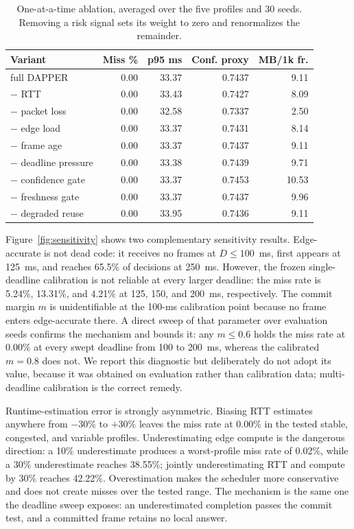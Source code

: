 \documentclass[conference,a4paper]{IEEEtran}
\begin{document}
\begin{table}[t]
\centering
\caption{One-at-a-time ablation, averaged over the five profiles and 30 seeds. Removing a risk signal sets its weight to zero and renormalizes the remainder.}
\label{tab:ablation}
\scriptsize
\renewcommand{\arraystretch}{0.88}
\setlength{\tabcolsep}{4pt}
\begin{tabular}{@{}lrrrr@{}}
\toprule
Variant & Miss \% & p95 ms & Conf. proxy & MB/1k fr. \\
\midrule
full DAPPER & 0.00 & 33.37 & 0.7437 & 9.11 \\
$-$ RTT & 0.00 & 33.43 & 0.7427 & 8.09 \\
$-$ packet loss & 0.00 & 32.58 & 0.7337 & 2.50 \\
$-$ edge load & 0.00 & 33.37 & 0.7431 & 8.14 \\
$-$ frame age & 0.00 & 33.37 & 0.7437 & 9.11 \\
$-$ deadline pressure & 0.00 & 33.38 & 0.7439 & 9.71 \\
$-$ confidence gate & 0.00 & 33.37 & 0.7453 & 10.53 \\
$-$ freshness gate & 0.00 & 33.37 & 0.7437 & 9.96 \\
$-$ degraded reuse & 0.00 & 33.95 & 0.7436 & 9.11 \\
\bottomrule
\end{tabular}
\end{table}

Figure~\ref{fig:sensitivity} shows two complementary sensitivity results. Edge-accurate is not dead code: it receives no frames at $D\leq100$~ms, first appears at 125~ms, and reaches 65.5\% of decisions at 250~ms. However, the frozen single-deadline calibration is not reliable at every larger deadline: the miss rate is 5.24\%, 13.31\%, and 4.21\% at 125, 150, and 200~ms, respectively. The commit margin $m$ is unidentifiable at the 100-ms calibration point because no frame enters edge-accurate there. A direct sweep of that parameter over evaluation seeds confirms the mechanism and bounds it: any $m\leq0.6$ holds the miss rate at 0.00\% at every swept deadline from 100 to 200~ms, whereas the calibrated $m=0.8$ does not. We report this diagnostic but deliberately do not adopt its value, because it was obtained on evaluation rather than calibration data; multi-deadline calibration is the correct remedy.

Runtime-estimation error is strongly asymmetric. Biasing RTT estimates anywhere from $-30$\% to $+30$\% leaves the miss rate at 0.00\% in the tested stable, congested, and variable profiles. Underestimating edge compute is the dangerous direction: a 10\% underestimate produces a worst-profile miss rate of 0.02\%, while a 30\% underestimate reaches 38.55\%; jointly underestimating RTT and compute by 30\% reaches 42.22\%. Overestimation makes the scheduler more conservative and does not create misses over the tested range. The mechanism is the same one the deadline sweep exposes: an underestimated completion passes the commit test, and a committed frame retains no local answer.
\end{document}
